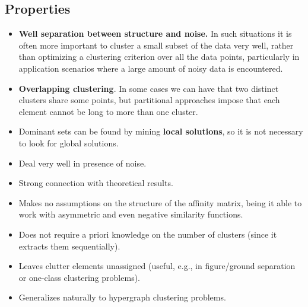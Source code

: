 \subsection{Properties}
\begin{itemize}
	\item \textbf{Well separation between structure and noise.} In such situations it is often more important to cluster a small subset of the data very well, rather than optimizing a clustering criterion over all the data points, particularly in application scenarios where a large amount of noisy data is encountered. 
	
	\item \textbf{Overlapping clustering}. In some cases we can have that two distinct clusters share some points, but partitional approaches impose that each element cannot be long to more than one cluster.
	
	\item Dominant sets can be found by mining \textbf{local solutions}, so it is not necessary to look for global solutions.
	
	\item Deal very well in presence of noise.
	
	\item Strong connection with theoretical results.
	
	\item Makes no assumptions on the structure of the affinity matrix, being it able to work with asymmetric and even negative similarity functions.
	
	\item Does not require a priori knowledge on the number of clusters (since it extracts them sequentially).
	
	\item Leaves clutter elements unassigned (useful, e.g., in figure/ground separation or one-class clustering problems).
	
	\item Generalizes naturally to hypergraph clustering problems.
\end{itemize}

